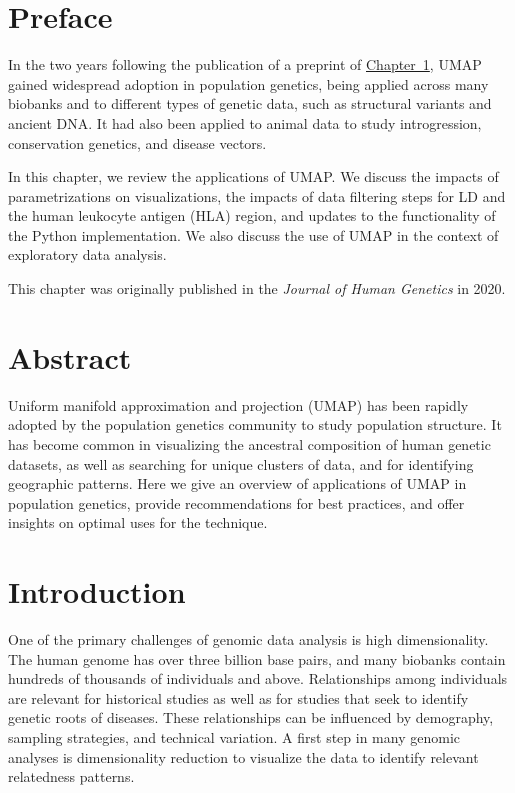 \setcounter{section}{-1}

\section{Preface}

In the two years following the publication of a preprint of \hyperref[chap:chapter1]{Chapter~1}, UMAP gained widespread adoption in population genetics, being applied across many biobanks and to different types of genetic data, such as structural variants and ancient DNA. It had also been applied to animal data to study introgression, conservation genetics, and disease vectors. 

In this chapter, we review the applications of UMAP. We discuss the impacts of parametrizations on visualizations, the impacts of data filtering steps for LD and the human leukocyte antigen (HLA) region, and updates to the functionality of the Python implementation. We also discuss the use of UMAP in the context of exploratory data analysis.

This chapter was originally published in the \textit{Journal of Human Genetics} in 2020.

\clearpage

\section{Abstract}

Uniform manifold approximation and projection (UMAP) has been rapidly adopted by the population genetics community to study population structure. It has become common in visualizing the ancestral composition of human genetic datasets, as well as searching for unique clusters of data, and for identifying geographic patterns. Here we give an overview of applications of UMAP in population genetics, provide recommendations for best practices, and offer insights on optimal uses for the technique.

\section{Introduction}
One of the primary challenges of genomic data analysis is high dimensionality. The human genome has over three billion base pairs, and many biobanks contain hundreds of thousands of individuals and above. Relationships among individuals are relevant for historical studies as well as for studies that seek to identify genetic roots of diseases. These relationships can be influenced by demography, sampling strategies, and technical variation. A first step in many genomic analyses is dimensionality reduction to visualize the data to identify relevant relatedness patterns. 

